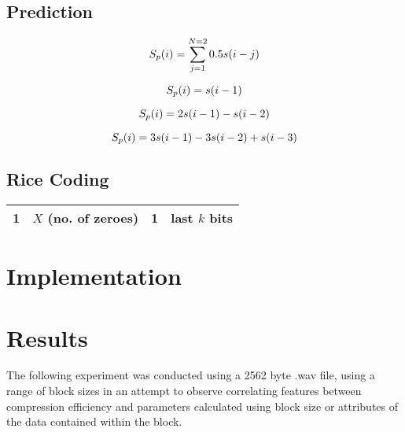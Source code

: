 \documentclass{article}
\begin{document}
\subsection*{Prediction}
\cite{makhoul1975linear}
\begin{equation}
S_p(i) = \sum_{j=1}^{N=2} 0.5s(i-j) \\
\end{equation}

\begin{equation}
S_p(i) = s(i-1) \\
\end{equation}

\begin{equation}
S_p(i) = 2s(i-1) - s(i-2) \\
\end{equation}

\begin{equation}
S_p(i) = 3s(i-1) - 3s(i-2) + s(i-3) \\
\end{equation}

\subsection*{Rice Coding}

\begin{center}
\begin{tabular}{|r|c|c|l|}
  \hline
  \textbf{1} & $X$ (no. of zeroes) & \textbf{1} & last $k$ bits \\
  \hline
\end{tabular}
\end{center}

\section*{Implementation}

\section*{Results}

The following experiment was conducted using a 2562 byte .wav file, using a range of block sizes in an attempt to observe correlating features between compression efficiency and parameters calculated using block size or attributes of the data contained within the block.
\end{document}
